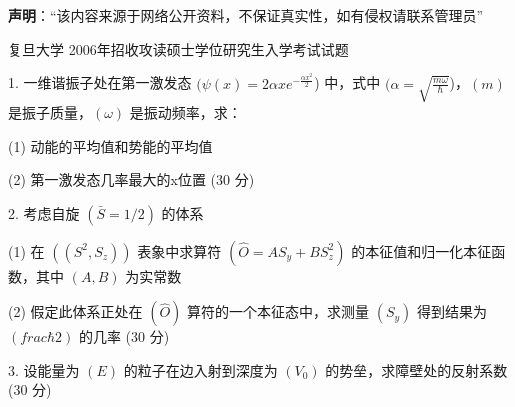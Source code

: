 

\begin{issues}
\issueTODO
\end{issues}

\textbf{声明}：“该内容来源于网络公开资料，不保证真实性，如有侵权请联系管理员”

复旦大学 2006年招收攻读硕士学位研究生入学考试试题

1. 一维谐振子处在第一激发态 $( \psi (x) = 2 \alpha x e^{-\frac{\alpha x^2}{2}} $) 中，式中 $( \alpha = \sqrt{\frac{m \omega}{\hbar}}$)，$( m )$ 是振子质量，$(\omega)$ 是振动频率，求：

(1) 动能的平均值和势能的平均值

(2) 第一激发态几率最大的x位置 (30 分)

2. 考虑自旋 $(\bar{S} = 1/2)$ 的体系

(1) 在 $((S^2, S_z))$ 表象中求算符 $(\hat{O} = A S_y + B S_z^2 )$ 的本征值和归一化本征函数，其中 $( A, B )$ 为实常数

(2) 假定此体系正处在 $(\hat{O})$ 算符的一个本征态中，求测量 $( S_y )$ 得到结果为 $(frac{\hbar}{2})$ 的几率 (30 分)

3. 设能量为 $( E )$ 的粒子在边入射到深度为 $( V_0 )$ 的势垒，求障壁处的反射系数 (30 分)
